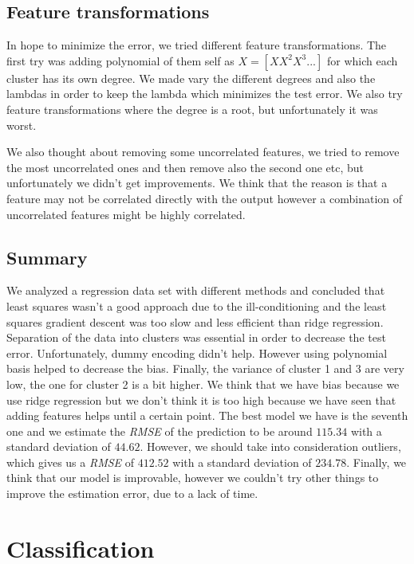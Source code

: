 \documentclass{article} %
\begin{document}
\subsection{Feature transformations}

In hope to minimize the error, we tried different feature transformations. The first try was adding polynomial of them self as $X = [X X^2 X^3 ...]$ for which each cluster has its own degree. We made vary the different degrees and also the lambdas in order to keep the lambda which minimizes the test error. We also try feature transformations where the degree is a root, but unfortunately it was worst.

We also thought about removing some uncorrelated features, we tried to remove the most uncorrelated ones and then remove also the second one etc, but unfortunately we didn't get improvements. We think that the reason is that a feature may not be correlated directly with the output however a combination of uncorrelated features might be highly correlated. 

\subsection{Summary}

We analyzed a regression data set with different methods and concluded that least squares wasn't a good approach due to the ill-conditioning and the least squares gradient descent was too slow and less efficient than ridge regression. Separation of the data into clusters was essential in order to decrease the test error. Unfortunately, dummy encoding didn't help. However using polynomial basis helped to decrease the bias. Finally, the variance of cluster 1 and 3 are very low, the one for cluster 2 is a bit higher. We think that we have bias because we use ridge regression but we don't think it is too high because we have seen that adding features helps until a certain point. The best model we have is the seventh one and we estimate the \textit{RMSE} of the prediction to be around $115.34$ with a standard deviation of $44.62$. However, we should take into consideration outliers, which gives us a \textit{RMSE} of $412.52$ with a standard deviation of $234.78$. Finally, we think that our model is improvable, however we couldn't try other things to improve the estimation error, due to a lack of time.

\section{Classification}
\end{document}
